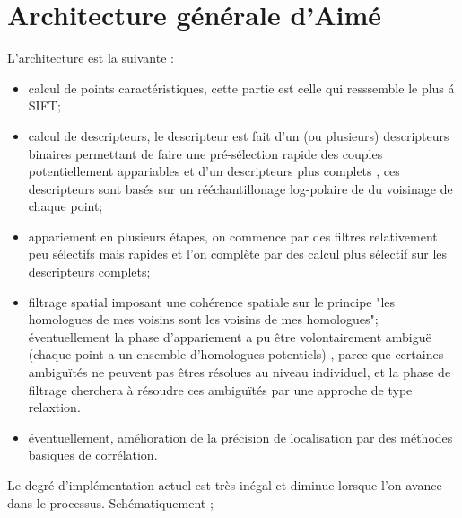 
\section{Architecture g\'en\'erale d'Aim\'e}

L'architecture est la suivante :

\begin{itemize}
   \item calcul de points caract\'eristiques, cette partie est celle qui resssemble le plus \'a SIFT;

   \item calcul de descripteurs, le descripteur est fait d'un (ou plusieurs) descripteurs binaires
         permettant de faire une pr\'e-s\'election rapide des couples potentiellement appariables et
         d'un descripteurs plus complets , ces descripteurs sont bas\'es sur un r\'e\'echantillonage
         log-polaire de du voisinage de chaque point;

   \item appariement en plusieurs \'etapes, on commence par des filtres relativement peu s\'electifs
        mais rapides et l'on compl\`ete par des calcul plus s\'electif sur les descripteurs complets;

   \item filtrage spatial imposant une coh\'erence spatiale sur le principe "les homologues de mes voisins
         sont les voisins de mes homologues"; \'eventuellement la phase d'appariement a pu \^etre volontairement
         ambigu\"e (chaque point a un ensemble d'homologues potentiels) , parce que  certaines ambigu\"it\'es ne
         peuvent  pas \^etres r\'esolues au niveau individuel, et la phase de filtrage cherchera \`a r\'esoudre
         ces ambigu\"it\'es par une approche de type relaxtion.

   \item \'eventuellement, am\'elioration de la pr\'ecision de localisation par des m\'ethodes basiques 
         de corr\'elation.

\end{itemize}

Le degr\'e d'impl\'ementation actuel est tr\`es in\'egal et diminue lorsque l'on avance dans le processus.
Sch\'ematiquement ;

